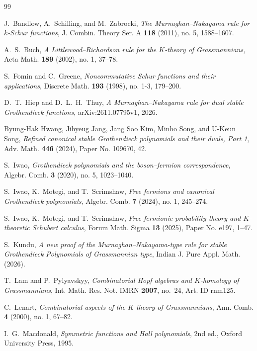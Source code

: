 \documentclass[11pt]{amsart}
\numberwithin{equation}{section}
\theoremstyle{definition}
\theoremstyle{remark}
\begin{document}
\begin{thebibliography}{99}

J.~Bandlow, A.~Schilling, and M.~Zabrocki,
\emph{The Murnaghan--Nakayama rule for $k$-Schur functions},
J. Combin. Theory Ser. A \textbf{118} (2011), no. 5, 1588--1607.

A.~S.~Buch,
\emph{A Littlewood--Richardson rule for the $K$-theory of Grassmannians},
Acta Math. \textbf{189} (2002), no. 1, 37--78.

S.~Fomin and C.~Greene,
\emph{Noncommutative Schur functions and their applications},
Discrete Math. \textbf{193} (1998), no. 1-3, 179--200.

D.~T.~Hiep and D.~L.~H.~Thuy,
\emph{A Murnaghan--Nakayama rule for dual stable Grothendieck functions},
arXiv:2611.07795v1, 2026.

Byung-Hak Hwang, Jihyeug Jang, Jang Soo Kim, Minho Song, and U-Keun Song,
\emph{Refined canonical stable {G}rothendieck polynomials and their duals, {P}art 1},
Adv. Math. \textbf{446} (2024), Paper No. 109670, 42.
    
S.~Iwao,
\emph{Grothendieck polynomials and the boson--fermion correspondence},
Algebr. Comb. \textbf{3} (2020), no. 5, 1023--1040.

S.~Iwao, K.~Motegi, and T.~Scrimshaw,
\emph{Free fermions and canonical Grothendieck polynomials},
Algebr. Comb. \textbf{7} (2024), no. 1, 245--274.

S.~Iwao, K.~Motegi, and T.~Scrimshaw,
\emph{Free fermionic probability theory and $K$-theoretic Schubert
calculus}, Forum Math. Sigma \textbf{13} (2025), Paper No. e197, 1--47.

S.~Kundu,
\emph{A new proof of the Murnaghan--Nakayama-type rule for stable Grothendieck Polynomials of Grassmannian type}, Indian J. Pure Appl. Math. (2026).

T.~Lam and P.~Pylyavskyy,
\emph{Combinatorial Hopf algebras and $K$-homology of Grassmannians},
Int. Math. Res. Not. IMRN \textbf{2007}, no.~24, Art. ID rnm125.

C.~Lenart,
\emph{Combinatorial aspects of the $K$-theory of Grassmannians},
Ann. Comb. \textbf{4} (2000), no. 1, 67--82.

I.~G.~Macdonald,
\emph{Symmetric functions and Hall polynomials}, 2nd ed.,
Oxford University Press, 1995.


\end{thebibliography}
\end{document}

